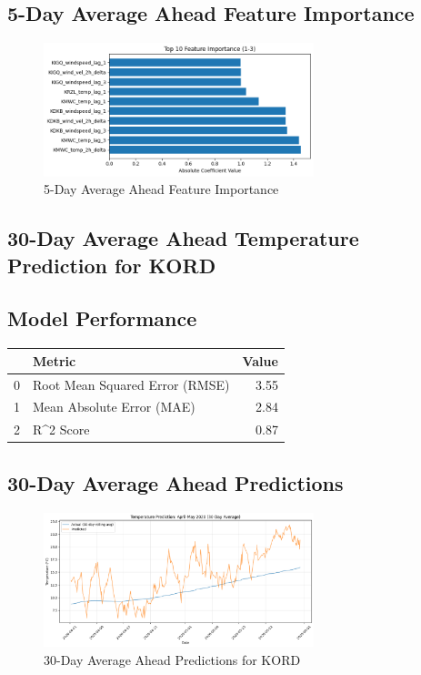 \subsection{5-Day Average Ahead Feature Importance}
\begin{figure}[htbp]
\centering
\includegraphics[width=0.7\textwidth]{1-3-linear_temp_shift_feature_importance.png}
\caption{5-Day Average Ahead Feature Importance}
\label{fig:5-day_average_ahead_featimp}
\end{figure}



\subsection{30-Day Average Ahead Temperature Prediction for KORD}
\subsection{Model Performance}
\begin{tabular}{llr}
\toprule
 & Metric & Value \\
\midrule
0 & Root Mean Squared Error (RMSE) & 3.55 \\
1 & Mean Absolute Error (MAE) & 2.84 \\
2 & R^2 Score & 0.87 \\
\bottomrule
\end{tabular}

\subsection{30-Day Average Ahead Predictions}
\begin{figure}[htbp]
\centering
\includegraphics[width=0.7\textwidth]{1-4-linear_temp_shift_results.png}
\caption{30-Day Average Ahead Predictions for KORD}
\label{fig:30-day_average_ahead_pred}
\end{figure}

